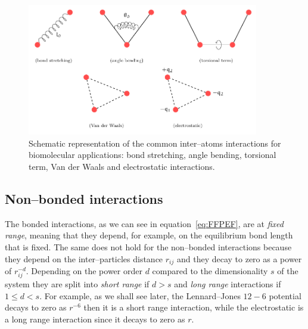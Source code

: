 \begin{figure}[!ht]
	\centering
	\includegraphics[width=0.9\textwidth]{./img/interPartInt/interPartInt}
	\caption{Schematic representation of the common inter--atoms interactions for biomolecular applications: bond stretching, angle bending, torsional term, Van der Waals and electrostatic interactions.}
	\label{fig:FFInteraction}
\end{figure}

\subsection{Non--bonded interactions}
\label{sec:nonbonded}
The bonded interactions, as we can see in equation~\eqref{eq:FFPEF}, are at \textit{fixed range}, meaning that they depend, for example, on the equilibrium bond length that is fixed. The same does not hold for the non--bonded interactions because they depend on the inter--particles distance $r_{ij}$ and they decay to zero as a power of $r_{ij}^{-d}$. Depending on the power order $d$ compared to the dimensionality $s$ of the system they are split into \textit{short range} if $d>s$ and \textit{long range} interactions if $1 \le d < s$. For example, as we shall see later, the Lennard--Jones $12-6$ potential decays to zero as $r^{-6}$ then it is a short range interaction, while the electrostatic is a long range interaction since it decays to zero as $r$.

